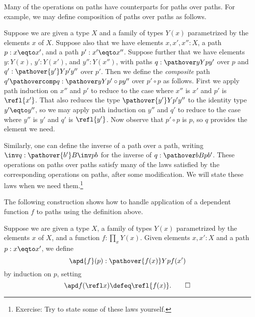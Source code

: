 Many of the operations on paths have counterparts for paths over paths.
For example, we may define composition of paths over paths as follows.

\begin{definition}\label{def:pathovercomposition}
  Suppose we are given a type $X$ and a family of types $Y(x)$ parametrized by the elements $x$ of $X$.
  Suppose also that we have elements $x, x', x'' : X$, a path $p : x \eqto x'$, and a path $p' : x' \eqto x''$.
  Suppose further that we have elements $y : Y(x)$, $y' : Y(x')$, and $y'' : Y(x'')$, with paths $q : \pathover y Y p {y'}$ over $p$
  and $q' : \pathover {y'} Y {p'} {y''}$ over $p'$.
  Then we define the \emph{composite} path $q' \pathovercomp q : \pathover y Y {p' \circ p} {y''}$ over $p' \circ p$ as follows.
  First we apply path induction on $x''$ and $p'$ to reduce to the case where $x''$ is $x'$ and $p'$ is $\refl{x'}$.
  That also reduces the type $\pathover {y'} Y {p'} {y''}$ to the identity type $y' \eqto y''$, so we may apply path induction on $y''$ and $q'$ to reduce
  to the case where $y''$ is $y'$ and $q'$ is $\refl{y'}$.
  Now observe that $p' \circ p$ is $p$, so $q$ provides the element we need.
\end{definition}

Similarly, one can define the inverse of a path over a path,
writing $\inv q : \pathover {b'} B {\inv p} b$ for the inverse
of $q : \pathover b B p {b'}$.
These operations on paths over paths
satisfy many of the laws satisfied by the corresponding operations on paths,
after some modification.
We will state these laws when we need them.\footnote{%
  Exercise: Try to state some of these laws yourself.}

The following construction shows how to handle application of a dependent
function $f$ to paths using the definition above.

\begin{definition}\label{def:apd}
  Suppose we are given a type $X$, a family of types $Y(x)$ parametrized by the elements $x$ of $X$, and a function $f:\prod_x Y(x)$.
  Given elements $x,x':X$ and a path $p : x \eqto x'$, we define
  \[
    \apd{f}(p) : \pathover {f(x)} Y p {f(x')}
  \]
  by induction on $p$, setting
  \[
    \apd f {(\refl x)} \defeq \refl {f(x)}.\qedhere
  \]
\end{definition}

